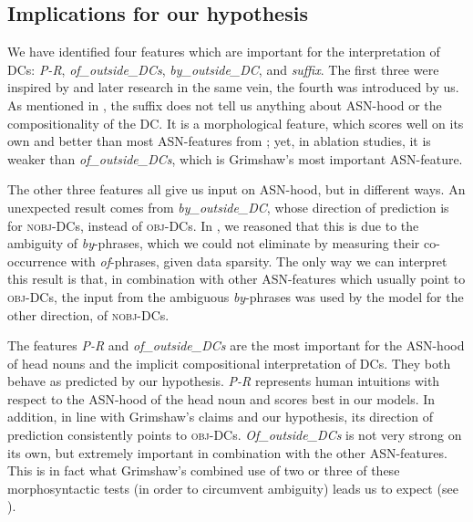 \documentclass[output=paper]{langsci/langscibook}
\begin{document}
\subsection{Implications for our hypothesis}\label{sec:gia:discussion-hypothesis}


We have identified four features which are important for the interpretation of DCs: \textit{P-R}, \textit{of\_outside\_DCs}, \textit{by\_outside\_DC}, and \textit{suffix}. The first three were inspired by \cite{grimshaw:90} and later research in the same vein, the fourth was introduced by us. As mentioned in , the suffix does not tell us anything about ASN-hood or the compositionality of the DC. It is a morphological feature, which scores well on its own and better than most ASN-features from \cite{grimshaw:90}; yet, in ablation studies, it is weaker than \textit{of\_outside\_DCs}, which is Grimshaw's most important ASN-feature.

The other three features all give us input on ASN-hood, but in different ways. An unexpected result comes from \textit{by\_outside\_DC}, whose direction of prediction is for \textsc{nobj}-DCs, instead of \textsc{obj}-DCs. In , we reasoned that this is due to the ambiguity of \textit{by}-phrases, which we could not eliminate by measuring their co-occurrence with \textit{of}-phrases, given data sparsity. The only way we can interpret this result is that, in combination with other ASN-features which usually point to \textsc{obj}-DCs, the input from the ambiguous \textit{by}-phrases was used by the model for the other direction, of \textsc{nobj}-DCs.

The features \textit{P-R} and \textit{of\_outside\_DCs} are the most important for the ASN-hood of head nouns and the implicit compositional interpretation of DCs. They both behave as predicted by our hypothesis. \textit{P-R} represents human intuitions with respect to the ASN-hood of the head noun and scores best in our models. In addition, in line with Grimshaw's claims and our hypothesis, its direction of prediction consistently points to \textsc{obj}-DCs. \textit{Of\_outside\_DCs} is not very strong on its own, but extremely important in combination with the other ASN-features. This is in fact what Grimshaw's combined use of two or three of these morphosyntactic tests (in order to circumvent ambiguity) leads us to expect (see ).
\end{document}
